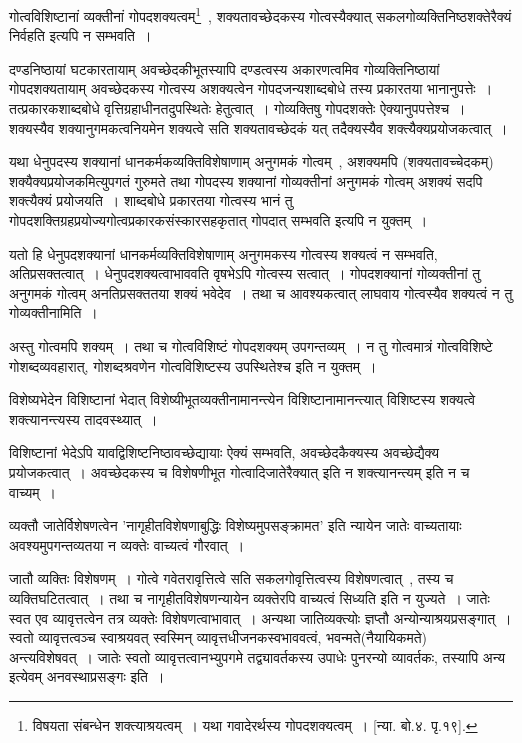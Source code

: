 			गोत्वविशिष्टानां व्यक्तीनां गोपदशक्यत्वम्\footnote{विषयता संबन्धेन शक्त्याश्रयत्वम्~। यथा गवादेरर्थस्य गोपदशक्यत्वम्~। [न्या. बो.४. पृ.१९].}~, शक्यतावच्छेदकस्य गोत्वस्यैक्यात् सकलगोव्यक्तिनिष्ठशक्तेरैक्यं निर्वहति इत्यपि न सम्भवति~। 

			दण्डनिष्ठायां घटकारतायाम् अवच्छेदकीभूतस्यापि दण्डत्वस्य अकारणत्वमिव गोव्यक्तिनिष्ठायां गोपदशक्यतायाम् अवच्छेदकस्य गोत्वस्य अशक्यत्वेन गोपदजन्यशाब्दबोधे तस्य प्रकारतया भानानुपत्तेः~। तत्प्रकारकशाब्दबोधे वृत्तिग्रहाधीनतदुपस्थितेः हेतुत्वात्~। गोव्यक्तिषु गोपदशक्तेः  ऐक्यानुपपत्तेश्च~। शक्यस्यैव शक्यानुगमकत्वनियमेन शक्यत्वे सति शक्यतावच्छेदकं यत् तदैक्यस्यैव शक्त्यैक्यप्रयोजकत्वात्~। 

			यथा धेनुपदस्य शक्यानां धानकर्मकव्यक्तिविशेषाणाम् अनुगमकं  गोत्वम्~, अशक्यमपि (शक्यतावच्चेदकम्) शक्यैक्यप्रयोजकमित्युपगतं गुरुमते तथा गोपदस्य शक्यानां गोव्यक्तीनां अनुगमकं गोत्वम् अशक्यं सदपि शक्त्यैक्यं प्रयोजयति~। शाब्दबोधे प्रकारतया गोत्वस्य भानं तु गोपदशक्तिग्रहप्रयोज्यगोत्वप्रकारकसंस्कारसहकृतात् गोपदात् सम्भवति इत्यपि न युक्तम्~। 

			यतो हि धेनुपदशक्यानां धानकर्मव्यक्तिविशेषाणाम् अनुगमकस्य गोत्वस्य शक्यत्वं न सम्भवति, अतिप्रसक्तत्वात्~। धेनुपदशक्यत्वाभाववति वृषभेऽपि गोत्वस्य सत्वात्~। गोपदशक्यानां गोव्यक्तीनां तु अनुगमकं गोत्वम् अनतिप्रसक्ततया शक्यं भवेदेव~। तथा च आवश्यकत्वात् लाघवाय गोत्वस्यैव शक्यत्वं न तु गोव्यक्तीनामिति~।

			अस्तु गोत्वमपि शक्यम्~। तथा च गोत्वविशिष्टं गोपदशक्यम् उपगन्तव्यम्~। न तु गोत्वमात्रं गोत्वविशिष्टे गोशब्दव्यवहारात्, गोशब्दश्रवणेन गोत्वविशिष्टस्य उपस्थितेश्च इति न युक्तम्~।

			विशेष्यभेदेन विशिष्टानां भेदात् विशेष्यीभूतव्यक्तीनामानन्त्येन विशिष्टानामानन्त्यात् विशिष्टस्य शक्यत्वे शक्त्यानन्त्यस्य तादवस्थ्यात्~।

			विशिष्टानां भेदेऽपि यावद्विशिष्टनिष्ठावच्छेद्यायाः ऐक्यं सम्भवति, अवच्छेदकैक्यस्य अवच्छेद्यैक्य प्रयोजकत्वात्~। अवच्छेदकस्य च विशेषणीभूत गोत्वादिजातेरैक्यात् इति न शक्त्यानन्त्यम् इति न च वाच्यम्~।

			व्यक्तौ जातेर्विशेषणत्वेन 'नागृहीतविशेषणाबुद्धिः विशेष्यमुपसङ्क्रामत' इति न्यायेन जातेः वाच्यतायाः अवश्यमुपगन्तव्यतया न व्यक्तेः वाच्यत्वं गौरवात्~।

			जातौ व्यक्तिः विशेषणम्~। गोत्वे गवेतरावृत्तित्वे सति सकलगोवृत्तित्वस्य विशेषणत्वात्~, तस्य च व्यक्तिघटितत्वात्~। तथा च नागृहीतविशेषणन्यायेन व्यक्तेरपि वाच्यत्वं सिध्यति इति न युज्यते~। जातेः स्वत एव व्यावृत्तत्वेन तत्र व्यक्तेः विशेषणत्वाभावात्~। अन्यथा जातिव्यक्त्योः ज्ञप्तौ अन्योन्याश्रयप्रसङ्गात्~। स्वतो व्यावृत्तत्वञ्च स्वाश्रयवत् स्वस्मिन् व्यावृत्तधीजनकस्वभाववत्वं, भवन्मते(नैयायिकमते) अन्त्यविशेषवत्~। जातेः स्वतो व्यावृत्तत्वानभ्युपगमे तद्व्यावर्तकस्य उपाधेः पुनरन्यो व्यावर्तकः, तस्यापि अन्य इत्येवम् अनवस्थाप्रसङ्गः इति~।

